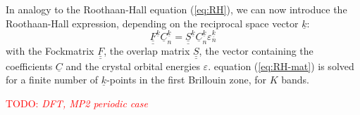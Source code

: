 \documentclass[11pt,DIV=13,BCOR=5mm,a4paper,headinclude]{scrbook}
\newcommand\todo[1]{\textcolor{red}{TODO: \textit{{#1}}}}
\renewcommand{\vec}[1]{\underline{#1}}
\def\doubleunderline#1{\underline{\underline{#1}}}
\begin{document}
In analogy to the Roothaan-Hall equation (\ref{eq:RH}), we can now introduce the Roothaan-Hall expression, depending on the reciprocal space vector $\vec{k}$:
 \begin{equation}\label{eq:RH-mat}
  \doubleunderline{F}^{\vec{k}}\vec{C}_n^{\vec{k}}=\doubleunderline{S}^{\vec{k}}\vec{C}_n^{\vec{k}}\varepsilon_n^{\vec{k}}
 \end{equation}
with the Fockmatrix $\doubleunderline{F}$, the overlap matrix $\doubleunderline{S}$, the vector containing the coefficients $\vec{C}$ and the crystal orbital energies $\varepsilon$.
equation (\ref{eq:RH-mat}) is solved for a finite number of $\vec{k}$-points in the first Brillouin zone, for $K$ bands.



\todo{DFT, MP2 periodic case}
\end{document}
